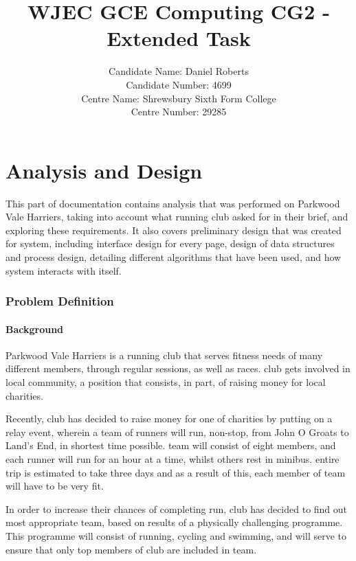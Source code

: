 \documentclass{article}[12pt,a4paper]
\begin{document}
\title{WJEC GCE Computing CG2 - Extended Task}

\author{Candidate Name: Daniel Roberts\\
        Candidate Number: 4699\\
        Centre Name: Shrewsbury Sixth Form College\\
        Centre Number: 29285}

\date{}

\maketitle

\tableofcontents

\cleardoublepage

\part{Analysis and Design}
This part of documentation contains analysis that was performed on Parkwood Vale Harriers, taking into account what running club asked for in their brief, and exploring these requirements. It also covers preliminary design that was created for system, including interface design for every page, design of data structures and process design, detailing different algorithms that have been used, and how system interacts with itself.

\section{Problem Definition}
\subsection{Background}
Parkwood Vale Harriers is a running club that serves fitness needs of many different members, through regular sessions, as well as races. club gets involved in local community, a position that consists, in part, of raising money for local charities. 

Recently, club has decided to raise money for one of charities by putting on a relay event, wherein a team of runners will run, non-stop, from John O\textsc{} Groats to Land’s End, in shortest time possible. team will consist of eight members, and each runner will run for an hour at a time, whilst others rest in minibus. entire trip is estimated to take three days and as a result of this, each member of team will have to be very fit.

In order to increase their chances of completing run, club has decided to find out most appropriate team, based on results of a physically challenging programme. This programme will consist of running, cycling and swimming, and will serve to ensure that only top members of club are included in team.
\end{document}
